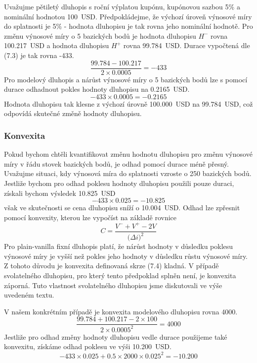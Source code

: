 \documentclass[a4paper]{book}
\begin{document}
Uvažujme pětiletý dluhopis s roční výplatou kupónu, kupónovou sazbou 5\% a nominální hodnotou 100~USD. Předpokládejme, že výchozí úroveň výnosové míry do splatnosti je 5\% - hodnota dluhopisu je tak rovna jeho nominální hodnotě. Pro změnu výnosové míry o 5 bazických bodů je hodnota dluhopisu $H^{-}$ rovna 100.217~USD a hodnota dluhopisu $H^{+}$ rovna 99.784~USD. Durace vypočtená dle (7.3) je tak rovna -433.
\begin{equation*}
\frac{99.784 - 100.217}{2 \times 0.0005} = -433
\end{equation*}
Pro modelový dluhopis a nárůst výnosové míry o 5 bazických bodů lze s pomocí durace odhadnout pokles hodnoty dluhopisu na 0.2165~USD.
\begin{equation*}
-433 \times 0.0005 = -0.2165
\end{equation*}
Hodnota dluhopisu tak klesne z výchozí úrovně 100.000~USD na 99.784~USD, což odpovídá skutečné změně hodnoty dluhopisu.

\subsubsection{Konvexita}

Pokud bychom chtěli kvantifikovat změnu hodnotu dluhopisu pro změnu výnosové míry v řádu stovek bazických bodů, je odhad pomocí durace méně přesný. Uvažujme situaci, kdy výnosová míra do splatnosti vzroste o 250 bazických bodů. Jestliže bychom pro odhad poklesu hodnoty dluhopisu použili pouze duraci, získali bychom výsledek 10.825~USD
\begin{equation*}
-433 \times 0.025 = -10.825
\end{equation*}
však ve skutečnosti se cena dluhopisu sníží o 10.004~USD. Odhad lze zpřesnit pomocí konvexity, kterou lze vypočíst na základě rovnice
\begin{equation}
C = \frac{V^{-} + V^{+} - 2 V}{\big( \Delta i\big)^2}
\end{equation}
Pro plain-vanilla fixní dluhopis platí, že nárůst hodnoty v důsledku poklesu výnosové míry je vyšší než pokles jeho hodnoty v důsledku růstu výnosové míry. Z tohoto důvodu je konvexita definovaná skrze (7.4) kladná. V případě svolatelného dluhopisu, pro který tento předpoklad splněn není, je konvexita záporná. Tuto vlastnost svolatelného dluhopisu jsme diskutovali ve výše uvedeném textu.

V našem konkrétním případě je konvexita modelového dluhopisu rovna 4000.
\begin{equation*}
\frac{99.784 + 100.217 - 2 \times 100}{2 \times 0.0005^2} = 4000
\end{equation*}
Jestliže pro odhad změny hodnoty dluhopisu vedle durace použijeme také konvexitu, získáme odhad poklesu ve výši 10.200~USD.
\begin{equation*}
-433 \times 0.025 + 0.5 \times 2000 \times 0.025^2 = -10.200
\end{equation*}
\end{document}
